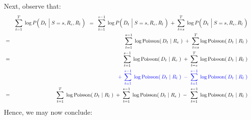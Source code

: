Next, observe that:
\begin{eqnarray*}
&&
	\overset{T}{\underset{t=1}{\sum}}\;
	\log P\!\left(\,D_{t} \,\left\vert\; S\overset{{\color{white}1}}{=}s,R_{e},R_{l}\right.\,\right)
\;\; = \;\;
	\overset{s-1}{\underset{t=1}{\sum}}\;
	\log P\!\left(\,D_{t} \,\left\vert\; S\overset{{\color{white}1}}{=}s,R_{e},R_{l}\right.\,\right)
	\; + \;
	\overset{T}{\underset{t=s}{\sum}}\;
	\log P\!\left(\,D_{t} \,\left\vert\; S\overset{{\color{white}1}}{=}s,R_{e},R_{l}\right.\,\right)
\\
&=&
	\overset{s-1}{\underset{t=1}{\sum}}\;
	\log\textnormal{Poisson}\!\left(\,D_{t} \,\left\vert\; R_{e}\right.\,\right)
	\; + \;
	\overset{T}{\underset{t=s}{\sum}}
	\log\textnormal{Poisson}\!\left(\,D_{t} \,\left\vert\; R_{l}\right.\,\right)
\\
&=&
	{\color{white}+}\;\,
	\overset{s-1}{\underset{t=1}{\sum}}\;
	\log\textnormal{Poisson}\!\left(\,D_{t} \,\left\vert\; R_{e}\right.\,\right)
	\; + \;
	\overset{T}{\underset{t=s}{\sum}}\;
	\log\textnormal{Poisson}\!\left(\,D_{t} \,\left\vert\; R_{l}\right.\,\right)
\\
&&
	{\color{blue}
	+\;\,
	\overset{s-1}{\underset{t=1}{\sum}}\;
	\log\textnormal{Poisson}\!\left(\,D_{t} \,\left\vert\; R_{l}\right.\,\right)
	\; - \;
	\overset{s-1}{\underset{t=1}{\sum}}\;
	\log\textnormal{Poisson}\!\left(\,D_{t} \,\left\vert\; R_{l}\right.\,\right)
	}
\\
&=&
	\overset{T}{\underset{t=1}{\sum}}\;
	\log\textnormal{Poisson}\!\left(\,D_{t} \,\left\vert\; R_{l}\right.\,\right)
	\;+\;
	\overset{s-1}{\underset{t=1}{\sum}}\;
	\log\textnormal{Poisson}\!\left(\,D_{t} \,\left\vert\; R_{e}\right.\,\right)
		\;-\;\,
		\overset{s-1}{\underset{t=1}{\sum}}\;
		\log\textnormal{Poisson}\!\left(\,D_{t} \,\left\vert\; R_{l}\right.\,\right)
\end{eqnarray*}
Hence, we may now conclude:
